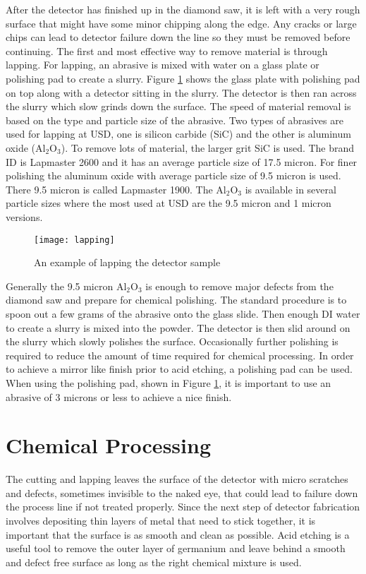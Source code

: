 After the detector has finished up in the diamond saw, it is left with a very rough surface that might have some minor chipping along the edge.
Any cracks or large chips can lead to detector failure down the line so they must be removed before continuing.
The first and most effective way to remove material is through lapping.
For lapping, an abrasive is mixed with water on a glass plate or polishing pad to create a slurry.
Figure \ref{fig:lapping} shows the glass plate with polishing pad on top along with a detector sitting in the slurry.
The detector is then ran across the slurry which slow grinds down the surface.
The speed of material removal is based on the type and particle size of the abrasive.
Two types of abrasives are used for lapping at USD, one is silicon carbide (SiC) and the other is aluminum oxide (Al$_2$O$_3$).
To remove lots of material, the larger grit SiC is used.
The brand ID is Lapmaster 2600 and it has an average particle size of 17.5 micron.
For finer polishing the aluminum oxide with average particle size of 9.5 micron is used.
There 9.5 micron is called Lapmaster 1900.
The Al$_2$O$_3$ is available in several particle sizes where the most used at USD are the 9.5 micron and 1 micron versions.
\begin{figure}[htpb]
\centering
\texttt{[image: lapping]}
\caption{An example of lapping the detector sample}
\label{fig:lapping}
\end{figure}
Generally the 9.5 micron Al$_2$O$_3$ is enough to remove major defects from the diamond saw and prepare for chemical polishing.
The standard procedure is to spoon out a few grams of the abrasive onto the glass slide.
Then enough DI water to create a slurry is mixed into the powder.
The detector is then slid around on the slurry which slowly polishes the surface.
Occasionally further polishing is required to reduce the amount of time required for chemical processing.
In order to achieve a mirror like finish prior to acid etching, a polishing pad can be used.
When using the polishing pad, shown in Figure \ref{fig:lapping}, it is important to use an abrasive of 3 microns or less to achieve a nice finish.

\section{Chemical Processing}

The cutting and lapping leaves the surface of the detector with micro scratches and defects, sometimes invisible to the naked eye, that could lead to failure down the process line if not treated properly.
Since the next step of detector fabrication involves depositing thin layers of metal that need to stick together, it is important that the surface is as smooth and clean as possible.
Acid etching is a useful tool to remove the outer layer of germanium and leave behind a smooth and defect free surface as long as the right chemical mixture is used.  

